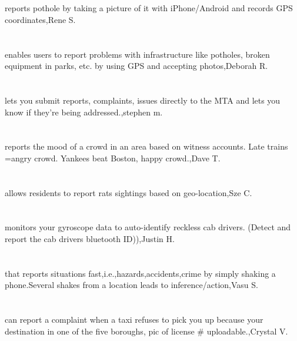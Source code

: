 \section{}reports pothole by taking a picture of it with iPhone/Android and records GPS coordinates,Rene S.	
\section{}enables users to report problems with infrastructure like potholes, broken equipment in parks, etc. by using GPS and accepting photos,Deborah R.	
\section{}lets you submit reports, complaints, issues directly to the MTA and lets you know if they're being addressed.,stephen m.	
\section{}reports the mood of a crowd in an area based on witness accounts. Late trains =angry crowd. Yankees beat Boston, happy crowd.,Dave T.	
\section{}allows residents to report rats sightings based on geo-location,Sze C.	
\section{}monitors your gyroscope data to auto-identify reckless cab drivers. (Detect and report the cab drivers bluetooth ID)),Justin H.	
\section{}that reports situations fast,i.e.,hazards,accidents,crime by simply shaking a phone.Several shakes from a location leads to inference/action,Vasu S.	
\section{}can report a complaint when a taxi refuses to pick you up because your destination in one of the five boroughs, pic of license \# uploadable.,Crystal  V.	
